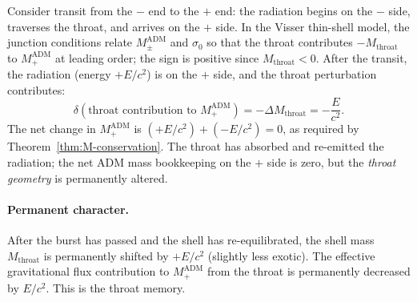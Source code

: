 \documentclass[aps,prd,onecolumn,nofootinbib,superscriptaddress]{revtex4-2}
\begin{document}
Consider transit from the $-$ end to the $+$ end: the radiation begins on the
$-$ side, traverses the throat, and arrives on the $+$ side.  In the
Visser thin-shell model, the junction conditions relate $M_\pm^{\mathrm{ADM}}$
and $\sigma_0$ so that the throat contributes $-M_{\mathrm{throat}}$ to
$M_+^{\mathrm{ADM}}$ at leading order; the sign is positive since
$M_{\mathrm{throat}}<0$.  After the transit, the radiation (energy $+E/c^2$)
is on the $+$ side, and the throat perturbation contributes:
\begin{equation}
  \delta(\text{throat contribution to }M_+^{\mathrm{ADM}})
  = -\Delta M_{\mathrm{throat}} = -\frac{E}{c^2}.
\end{equation}
The net change in $M_+^{\mathrm{ADM}}$ is $(+E/c^2) + (-E/c^2) = 0$, as
required by Theorem~\ref{thm:M-conservation}.  The throat has absorbed and
re-emitted the radiation; the net ADM mass bookkeeping on the $+$ side is
zero, but the \emph{throat geometry} is permanently altered.

\paragraph{Permanent character.}
After the burst has passed and the shell has re-equilibrated, the shell mass
$M_{\mathrm{throat}}$ is permanently shifted by $+E/c^2$ (slightly less
exotic).  The effective gravitational flux contribution to $M_+^{\mathrm{ADM}}$
from the throat is permanently decreased by $E/c^2$.  This is the throat
memory.



\end{document}
